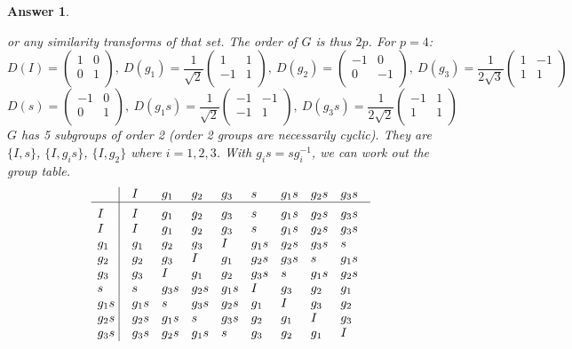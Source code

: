 \documentclass[a4paper]{article}
\newtheorem{ans}{Answer}[section]
\theoremstyle{new}
\begin{document}
\begin{ans}
\begin{enumerate}[label=(\alph*)]
or any similarity transforms of that set. The order of $G$ is thus $2p$. For $p=4$:
$$D(I)=\begin{pmatrix}1&0\\0&1\\\end{pmatrix},~D(g_1)=\frac{1}{\sqrt{2}}\begin{pmatrix}1&1\\-1&1\\\end{pmatrix},~D(g_2)=\begin{pmatrix}-1&0\\0&-1\\\end{pmatrix},~D(g_3)=\frac{1}{2\sqrt{3}}\begin{pmatrix}1&-1\\1&1\\\end{pmatrix}$$
$$D(s)=\begin{pmatrix}-1&0\\0&1\\\end{pmatrix},~D(g_1s)=\frac{1}{\sqrt{2}}\begin{pmatrix}-1&-1\\-1&1\\\end{pmatrix},~D(g_3s)=\frac{1}{2\sqrt{2}}\begin{pmatrix}-1&1\\1&1\\\end{pmatrix}$$
$G$ has 5 subgroups of order 2 (order 2 groups are necessarily cyclic). They are $\{I,s\}$, $\{I,g_is\}$, $\{I,g_2\}$ where $i=1,2,3$. With $g_is=sg_i^{-1}$, we can work out the group table.
$$\vbox{\tabskip0.5em\offinterlineskip
    \halign{\strut$#$\hfil\ \tabskip1em\vrule&&$#$\hfil\cr
    ~&I&g_1&g_2&g_3&s&g_1s&g_2s&g_3s   \cr
    \noalign{\hrule}\vrule height 12pt width 0pt
     I&I&g_1&g_2&g_3&s&g_1s&g_2s&g_3s    \cr
     I&I&g_1&g_2&g_3&s&g_1s&g_2s&g_3s    \cr
     g_1 & g_1 &g_2  & g_3 & I & g_1s& g_2s&g_3s&s  \cr
     g_2 & g_2 & g_3 & I & g_1&g_2s&g_3s&s&g_1s\cr
     g_3 & g_3 & I &g_1 & g_2& g_3s& s&g_1s&g_2s\cr
     s & s & g_3s& g_2s&g_1s&I&g_3&g_2&g_1 \cr
     g_1s& g_1s &s &g_3s&g_2s&g_1& I & g_3& g_2 \cr
     g_2s & g_2s& g_1s&s &g_3s& g_2& g_1 & I & g_3 \cr
     g_3s & g_3s & g_2s & g_1s & s & g_3 &g_2 & g_1 & I \cr
}}$$


\end{enumerate}
\end{ans}
\newpage
\end{document}
